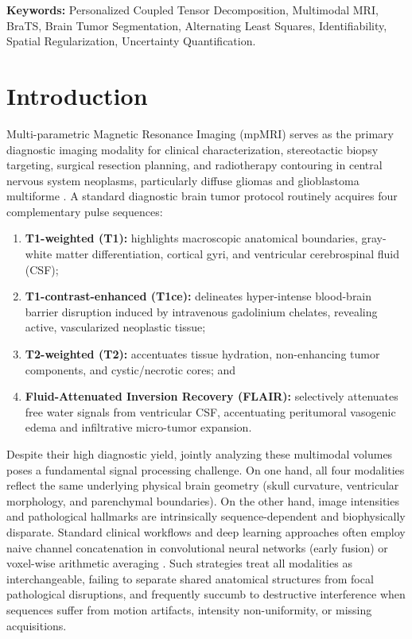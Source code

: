 \documentclass[11pt,a4paper]{article}
\begin{document}
\vspace{0.5em}
\noindent \textbf{Keywords:} Personalized Coupled Tensor Decomposition, Multimodal MRI, BraTS, Brain Tumor Segmentation, Alternating Least Squares, Identifiability, Spatial Regularization, Uncertainty Quantification.

\hrulefill

\section{Introduction}
\label{sec:intro}

Multi-parametric Magnetic Resonance Imaging (mpMRI) serves as the primary diagnostic imaging modality for clinical characterization, stereotactic biopsy targeting, surgical resection planning, and radiotherapy contouring in central nervous system neoplasms, particularly diffuse gliomas and glioblastoma multiforme \cite{menze2014brats, bakas2018brats}. A standard diagnostic brain tumor protocol routinely acquires four complementary pulse sequences:
\begin{enumerate}[label=(\roman*)]
    \item \textbf{T1-weighted (T1):} highlights macroscopic anatomical boundaries, gray-white matter differentiation, cortical gyri, and ventricular cerebrospinal fluid (CSF);
    \item \textbf{T1-contrast-enhanced (T1ce):} delineates hyper-intense blood-brain barrier disruption induced by intravenous gadolinium chelates, revealing active, vascularized neoplastic tissue;
    \item \textbf{T2-weighted (T2):} accentuates tissue hydration, non-enhancing tumor components, and cystic/necrotic cores; and
    \item \textbf{Fluid-Attenuated Inversion Recovery (FLAIR):} selectively attenuates free water signals from ventricular CSF, accentuating peritumoral vasogenic edema and infiltrative micro-tumor expansion.
\end{enumerate}

Despite their high diagnostic yield, jointly analyzing these multimodal volumes poses a fundamental signal processing challenge. On one hand, all four modalities reflect the same underlying physical brain geometry (skull curvature, ventricular morphology, and parenchymal boundaries). On the other hand, image intensities and pathological hallmarks are intrinsically sequence-dependent and biophysically disparate. Standard clinical workflows and deep learning approaches often employ naive channel concatenation in convolutional neural networks (early fusion) or voxel-wise arithmetic averaging \cite{zhou2019review}. Such strategies treat all modalities as interchangeable, failing to separate shared anatomical structures from focal pathological disruptions, and frequently succumb to destructive interference when sequences suffer from motion artifacts, intensity non-uniformity, or missing acquisitions.
\end{document}
